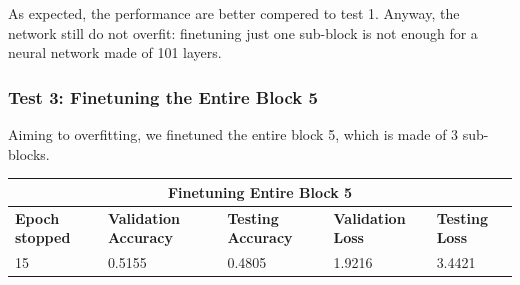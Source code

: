 As expected, the performance are better compered to test 1. Anyway, the network still do not overfit: finetuning just one sub-block is not enough for a neural network made of 101 layers. 

\subsubsection{Test 3: Finetuning the Entire Block 5}
Aiming to overfitting, we finetuned the entire block 5, which is made of 3 sub-blocks.

\medskip

\begin{tabular}{ |p{2cm}|p{2cm}|p{2cm}|p{2cm}|p{2cm}|  }
\hline
\multicolumn{5}{|c|}{Finetuning Entire Block 5} \\
\hline
\textbf{Epoch stopped} & \textbf{Validation Accuracy} & \textbf{Testing Accuracy} & \textbf{Validation Loss} & \textbf{Testing Loss} \\
\hline
15 & 0.5155 & 0.4805 & 1.9216 & 3.4421\\
\hline
\end{tabular}

